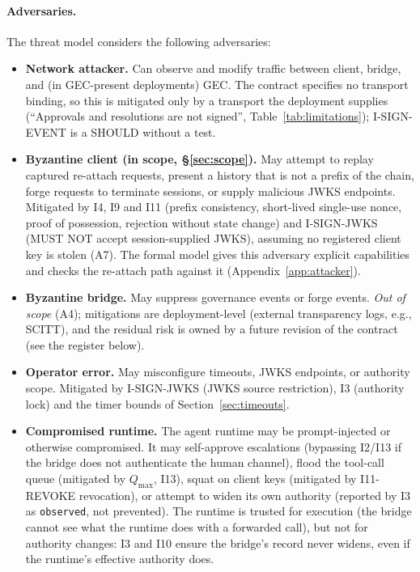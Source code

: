 \paragraph{Adversaries.} The threat model considers the following
adversaries:
\begin{itemize}[leftmargin=2em]
\item \textbf{Network attacker.} Can observe and modify traffic
between client, bridge, and (in GEC-present deployments) GEC.
The contract specifies no transport binding, so this is mitigated only by a transport the deployment supplies (``Approvals and resolutions are not signed'', Table~\ref{tab:limitations}); I-SIGN-EVENT is a SHOULD without a test.
\item \textbf{Byzantine client (in scope, \S\ref{sec:scope}).} May attempt to replay captured
re-attach requests, present a history that is not a prefix of the chain,
forge requests to terminate sessions, or supply malicious JWKS
endpoints. Mitigated by I4, I9 and I11 (prefix consistency, short-lived
single-use nonce, proof of possession, rejection without state change)
and I-SIGN-JWKS (MUST NOT accept session-supplied JWKS), assuming no
registered client key is stolen (A7).
The formal model gives this adversary explicit capabilities and checks
the re-attach path against it (Appendix~\ref{app:attacker}).
\item \textbf{Byzantine bridge.} May suppress governance events or
forge events. \emph{Out of scope} (A4); mitigations are
deployment-level (external transparency logs, e.g., SCITT), and the residual risk is owned by a future revision of the contract (see the register below).
\item \textbf{Operator error.} May misconfigure timeouts, JWKS
endpoints, or authority scope. Mitigated by I-SIGN-JWKS (JWKS
source restriction), I3 (authority lock) and the timer bounds of
Section~\ref{sec:timeouts}.
\item \textbf{Compromised runtime.} The agent runtime may be
prompt-injected or otherwise compromised. It may self-approve
escalations (bypassing I2/I13 if the bridge does not authenticate
the human channel), flood the tool-call queue (mitigated by
$Q_{\max}$, I13), squat on client keys (mitigated by I11-REVOKE
revocation), or attempt to widen its own authority (reported by I3
as \texttt{observed}, not prevented). The runtime is trusted for
execution (the bridge cannot see what the runtime does with a
forwarded call), but not for authority changes: I3 and I10 ensure
the bridge's record never widens, even if the runtime's effective
authority does.
\end{itemize}


